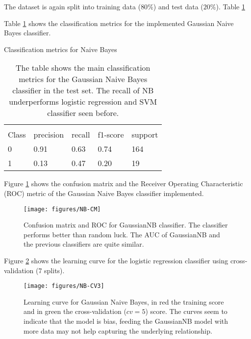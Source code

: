 \documentclass[11pt]{article}
\theoremstyle{definition}
\theoremstyle{remark}
\begin{document}
The dataset is again split into training data ($80\%$) and test data ($20\%$). Table \ref{tab:naive}

Table \ref{tab:naive} shows the classification metrics for the implemented Gaussian Naive Bayes classifier.
\begin{table}[H]
\caption{Classification metrics for Naive Bayes} 
\begin{center} 
\begin{tabular}{lllll}
\hline
\multicolumn{1}{c}{} \\
Class & precision & recall & f1-score & support     \\
\hline
0 & 0.91  &    0.63   &   0.74   &    164 \\
1 & 0.13  &    0.47   &   0.20   &    19 \\
\hline
\end{tabular}
\caption{The table shows the main classification metrics for the Gaussian Naive Bayes classifier in the test set. The recall of NB underperforms logistic regression and SVM classifier seen before.} \label{tab:naive} 
\end{center}
\end{table}

Figure \ref{fig:nb-cm} shows the confusion matrix and the Receiver Operating Characteristic (ROC) metric of the Gaussian Naive Bayes classifier implemented.
\begin{figure}[H]
        \centering
        \texttt{[image: figures/NB-CM]}
        \caption{Confusion matrix and ROC for GaussianNB classifier. The classifier performs better than random luck. The AUC of GaussianNB and the previous classifiers are quite similar.} \label{fig:nb-cm}
\end{figure}

Figure \ref{fig:nb-cv3} shows the learning curve for the logistic regression classifier using cross-validation (7 splits).
\begin{figure}[H]
        \centering
        \texttt{[image: figures/NB-CV3]}
        \caption{Learning curve for Gaussian Naive Bayes, in red the training score and in green the cross-validation ($cv=5$) score. The curves seem to indicate that the model is bias, feeding the GaussianNB model with more data may not help capturing the underlying relationship.
        } \label{fig:nb-cv3}
\end{figure}
\end{document}
